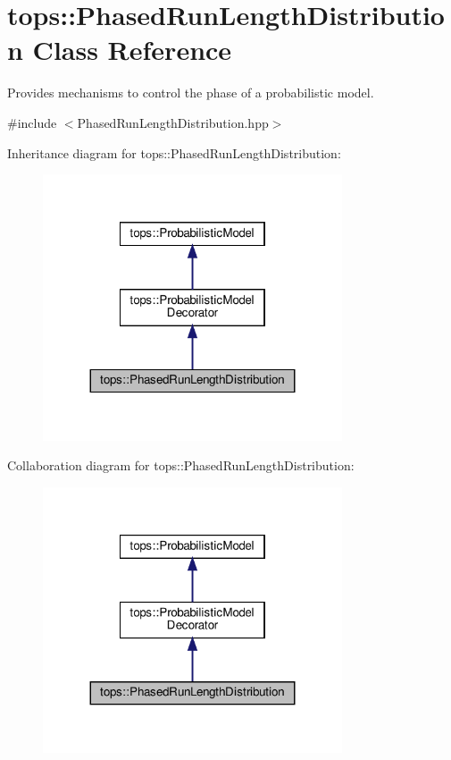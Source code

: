 \hypertarget{classtops_1_1PhasedRunLengthDistribution}{}\section{tops\+:\+:Phased\+Run\+Length\+Distribution Class Reference}
\label{classtops_1_1PhasedRunLengthDistribution}


Provides mechanisms to control the phase of a probabilistic model.  




{\ttfamily \#include $<$Phased\+Run\+Length\+Distribution.\+hpp$>$}



Inheritance diagram for tops\+:\+:Phased\+Run\+Length\+Distribution\+:
\nopagebreak
\begin{figure}[H]
\begin{center}
\leavevmode
\includegraphics[width=251pt]{classtops_1_1PhasedRunLengthDistribution__inherit__graph}
\end{center}
\end{figure}


Collaboration diagram for tops\+:\+:Phased\+Run\+Length\+Distribution\+:
\nopagebreak
\begin{figure}[H]
\begin{center}
\leavevmode
\includegraphics[width=251pt]{classtops_1_1PhasedRunLengthDistribution__coll__graph}
\end{center}
\end{figure}
